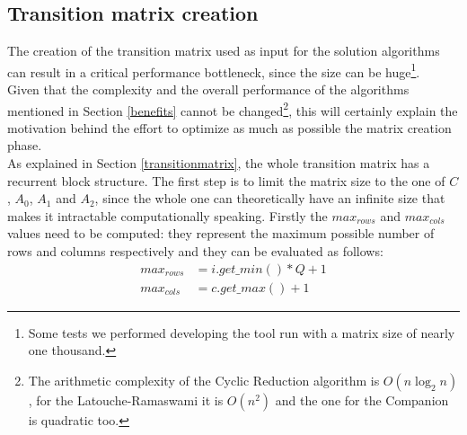 \subsection{Transition matrix creation} \label{matrixcreation}
The creation of the transition matrix used as input for the solution algorithms can result in a critical performance bottleneck, since the size can be huge\footnote{Some tests we performed developing the tool run with a matrix size of nearly one thousand.}.\\ 
Given that the complexity and the overall performance of the algorithms mentioned in Section \ref{benefits} cannot be changed\footnote{The arithmetic complexity of the Cyclic Reduction algorithm is \( O(n\log_2n) \), for the Latouche-Ramaswami it is \( O(n^{2}) \) and the one for the Companion is quadratic too.}, this will certainly explain the motivation behind the effort to optimize as much as possible the matrix creation phase.\\
As explained in Section \ref{transitionmatrix}, the whole transition matrix has a recurrent block structure. The first step is to limit the matrix size to the one of \( C \), \( A_{0} \), \( A_{1} \) and \( A_{2} \), since the whole one can theoretically have an infinite size that makes it intractable computationally speaking. Firstly the \( max_{rows} \) and \( max_{cols} \) values need to be computed: they represent the maximum possible number of rows and columns respectively and they can be evaluated as follows: 
\begin{equation*}
\begin{split}
  max_{rows} &= i.get\_min() * Q + 1 \\
  max_{cols} &= c.get\_max() + 1
\end{split}
\end{equation*}

